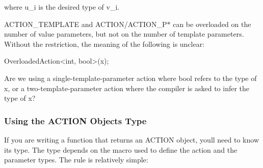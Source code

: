 where {\ttfamily u\+\_\+i} is the desired type of {\ttfamily v\+\_\+i}.

{\ttfamily A\+C\+T\+I\+O\+N\+\_\+\+T\+E\+M\+P\+L\+A\+TE} and {\ttfamily A\+C\+T\+I\+ON}/{\ttfamily A\+C\+T\+I\+O\+N\+\_\+\+P$\ast$} can be overloaded on the number of value parameters, but not on the number of template parameters. Without the restriction, the meaning of the following is unclear\+:


\begin{DoxyCode}
OverloadedAction<int, bool>(x);
\end{DoxyCode}


Are we using a single-\/template-\/parameter action where {\ttfamily bool} refers to the type of {\ttfamily x}, or a two-\/template-\/parameter action where the compiler is asked to infer the type of {\ttfamily x}?

\subsubsection*{Using the A\+C\+T\+I\+ON Object\textquotesingle{}s Type}

If you are writing a function that returns an {\ttfamily A\+C\+T\+I\+ON} object, you\textquotesingle{}ll need to know its type. The type depends on the macro used to define the action and the parameter types. The rule is relatively simple\+:

